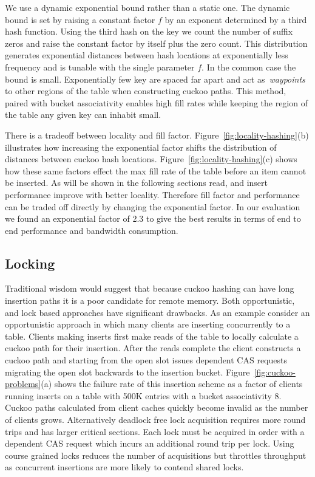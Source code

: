 We use a dynamic exponential bound rather than a static one.
The dynamic bound is set by raising a constant factor $f$ by
an exponent determined by a third hash function. Using the
third hash on the key we count the number of suffix zeros
and raise the constant factor by itself plus the zero count.
This distribution generates exponential distances between
hash locations at exponentially less frequency and is
tunable with the single parameter $f$.
In the common case the bound is small. Exponentially few key
are spaced far apart and act as~\textit{waypoints} to other
regions of the table when constructing cuckoo paths. This
method, paired with bucket associativity enables high fill
rates while keeping the region of the table any given key
can inhabit small.

There is a tradeoff between locality and fill factor.
Figure~\ref{fig:locality-hashing}(b) illustrates how
increasing the exponential factor shifts the distribution of
distances between cuckoo hash locations.
Figure~\ref{fig:locality-hashing}(c) shows how these same
factors effect the max fill rate of the table before an item
cannot be inserted. As will be shown in the following
sections read, and insert performance improve with better
locality. Therefore fill factor and performance can be
traded off directly by changing the exponential factor. In
our evaluation we found an exponential factor of 2.3 to give
the best results in terms of end to end performance and
bandwidth consumption.


\subsection{Locking}

Traditional wisdom would suggest that because cuckoo hashing
can have long insertion paths it is a poor candidate for
remote memory. Both opportunistic, and lock based approaches
have significant drawbacks.
As an example consider an opportunistic approach in which
many clients are inserting concurrently to a table. Clients
making inserts first make reads of the table to locally
calculate a cuckoo path for their insertion. After the reads
complete the client constructs a cuckoo path and starting
from the open slot issues dependent CAS requests migrating
the open slot backwards to the insertion bucket.
Figure~\ref{fig:cuckoo-problems}(a) shows the failure rate
of this insertion scheme as a factor of clients running
inserts on a table with 500K entries with a bucket
associativity 8. Cuckoo paths calculated from client caches
quickly become invalid as the number of clients grows.
Alternatively deadlock free lock acquisition requires more
round trips and has larger critical sections. Each lock must
be acquired in order with a dependent CAS request which
incurs an additional round trip per lock. Using course
grained locks reduces the number of acquisitions but
throttles throughput as concurrent insertions are more
likely to contend shared locks.


